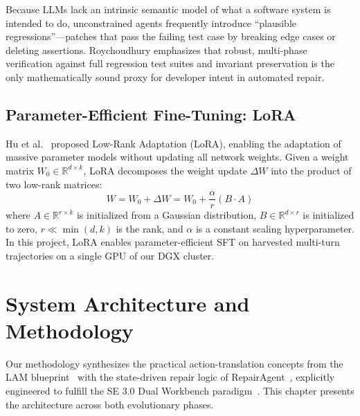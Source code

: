 \documentclass[12pt,a4paper]{report}
\begin{document}
Because LLMs lack an intrinsic semantic model of what a software system is intended to do, unconstrained agents frequently introduce ``plausible regressions''---patches that pass the failing test case by breaking edge cases or deleting assertions. Roychoudhury emphasizes that robust, multi-phase verification against full regression test suites and invariant preservation is the only mathematically sound proxy for developer intent in automated repair.

\section{Parameter-Efficient Fine-Tuning: LoRA}
Hu et al.~\cite{hu2021lora} proposed Low-Rank Adaptation (LoRA), enabling the adaptation of massive parameter models without updating all network weights. Given a weight matrix $W_0 \in \mathbb{R}^{d \times k}$, LoRA decomposes the weight update $\Delta W$ into the product of two low-rank matrices:
\begin{equation}
    W = W_0 + \Delta W = W_0 + \frac{\alpha}{r} (B \cdot A)
\end{equation}
where $A \in \mathbb{R}^{r \times k}$ is initialized from a Gaussian distribution, $B \in \mathbb{R}^{d \times r}$ is initialized to zero, $r \ll \min(d, k)$ is the rank, and $\alpha$ is a constant scaling hyperparameter. In this project, LoRA enables parameter-efficient SFT on harvested multi-turn trajectories on a single GPU of our DGX cluster.

\newpage
\chapter{System Architecture and Methodology}

Our methodology synthesizes the practical action-translation concepts from the LAM blueprint~\cite{wang2024large} with the state-driven repair logic of RepairAgent~\cite{bouzenia2025repairagent}, explicitly engineered to fulfill the SE 3.0 Dual Workbench paradigm~\cite{hassan2025agentic}. This chapter presents the architecture across both evolutionary phases.
\end{document}
